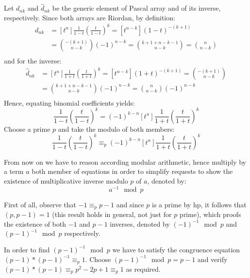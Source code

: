 \documentclass[10pt,a4paper]{article} %
\begin{document}
    Let $d_{nk}$ and $\hat{d}_{nk}$ be the generic element of Pascal
    array and of its inverse, respectively. Since both arrays are
    Riordan, by definition:
    \begin{displaymath}
        \begin{split}
            d_{nk} &= [t^n]\frac{1}{1-t}\left(\frac{t}{1-t}\right)^k = [t^{n-k}](1-t)^{-(k+1)} \\
                &= {{-(k+1)} \choose {n-k}}(-1)^{n-k} = {{k+1 +n-k -1} \choose {n-k}} = {{n} \choose {n-k}} \\
        \end{split}
    \end{displaymath}
    and for the inverse:
    \begin{displaymath}
      \begin{split}
        \hat{d}_{nk} &= [t^n]\frac{1}{1+t}\left(\frac{t}{1+t}\right)^k = [t^{n-k}](1+t)^{-(k+1)} = 
        {{-(k+1)} \choose {n-k}} \\
        &= {{k+1 +n-k -1} \choose {n-k}} (-1)^{n-k} = {{n} \choose {n-k}} (-1)^{n-k}\\
      \end{split}
    \end{displaymath}
    Hence, equating binomial coefficients yields:
    \begin{displaymath}
      [t^n]\frac{1}{1-t}\left(\frac{t}{1-t}\right)^k = (-1)^{k-n}[t^n]\frac{1}{1+t}\left(\frac{t}{1+t}\right)^k 
    \end{displaymath}
    Choose a prime $p$ and take the modulo of both members:
    \begin{displaymath}
      [t^n]\frac{1}{1-t}\left(\frac{t}{1-t}\right)^k \equiv_{p} (-1)^{k-n}[t^n]\frac{1}{1+t}\left(\frac{t}{1+t}\right)^k 
    \end{displaymath}

    From now on we have to reason according modular arithmetic, hence
    multiply by a term $a$ both member of equations in order to
    simplify requests to show the existence of multiplicative inverse
    modulo $p$ of $a$, denoted by: $$a^{-1}\mod p$$

    First of all, observe that $-1 \equiv_{p} p-1$ and since $p$ is a
    prime by hp, it follows that $(p, p-1)=1$ (this result holds in
    general, not just for $p$ prime), which proofs the existence of
    both $-1$ and $p-1$ inverses, denoted by $(-1)^{-1}\mod p$ and
    $(p-1)^{-1}\mod p$ respectively.

    In order to find $(p-1)^{-1}\mod p$ we have to satisfy the
    congruence equation $(p-1) * (p-1)^{-1} \equiv_{p} 1$. Choose
    $(p-1)^{-1}\mod p = p-1$ and verify
    $(p-1) * (p-1) \equiv_{p} p^2 -2p +1 \equiv_{p} 1$ as required.
\end{document}
